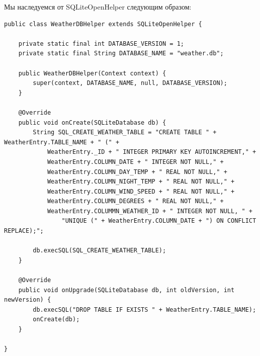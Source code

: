 \documentclass[12 pt]{article}
\begin{document}
	Мы наследуемся от SQLiteOpenHelper следующим образом:
	\begin{lstlisting}
public class WeatherDBHelper extends SQLiteOpenHelper {

    private static final int DATABASE_VERSION = 1;
    private static final String DATABASE_NAME = "weather.db";

    public WeatherDBHelper(Context context) {
        super(context, DATABASE_NAME, null, DATABASE_VERSION);
    }

    @Override
    public void onCreate(SQLiteDatabase db) {
        String SQL_CREATE_WEATHER_TABLE = "CREATE TABLE " + WeatherEntry.TABLE_NAME + " (" +
            WeatherEntry._ID + " INTEGER PRIMARY KEY AUTOINCREMENT," +
            WeatherEntry.COLUMN_DATE + " INTEGER NOT NULL," +
            WeatherEntry.COLUMN_DAY_TEMP + " REAL NOT NULL," +
            WeatherEntry.COLUMN_NIGHT_TEMP + " REAL NOT NULL," +
            WeatherEntry.COLUMN_WIND_SPEED + " REAL NOT NULL," +
            WeatherEntry.COLUMN_DEGREES + " REAL NOT NULL," +
            WeatherEntry.COLUMMN_WEATHER_ID + " INTEGER NOT NULL, " +
                "UNIQUE (" + WeatherEntry.COLUMN_DATE + ") ON CONFLICT REPLACE);";

        db.execSQL(SQL_CREATE_WEATHER_TABLE);
    }

    @Override
    public void onUpgrade(SQLiteDatabase db, int oldVersion, int newVersion) {
        db.execSQL("DROP TABLE IF EXISTS " + WeatherEntry.TABLE_NAME);
        onCreate(db);
    }

}
	\end{lstlisting}
	
\end{document}
